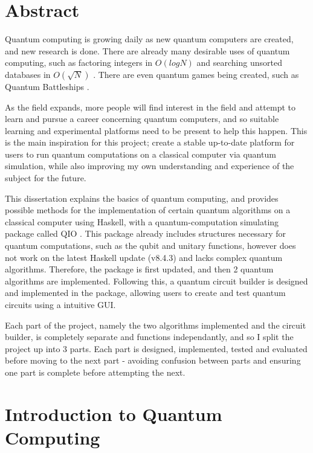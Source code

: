 \documentclass[a4paper,10pt, titlepage, twoside]{article}
\begin{document}
\section*{Abstract}
Quantum computing is growing daily as new quantum computers are created, and new research is done. There are already many desirable uses of quantum computing, such as factoring integers in $O(log N)$ \cite{shor} and searching unsorted databases in $O(\sqrt{N})$ \cite{grover}. There are even quantum games being created, such as Quantum Battleships \cite{qships}. \par
As the field expands, more people will find interest in the field and attempt to learn and pursue a career concerning quantum computers, and so suitable learning and experimental platforms need to be present to help this happen. This is the main inspiration for this project; create a stable up-to-date platform for users to run quantum computations on a classical computer via quantum simulation, while also improving my own understanding and experience of the subject for the future.\par
This dissertation explains the basics of quantum computing, and provides possible methods for the implementation of certain quantum algorithms on a classical computer using Haskell, with a quantum-computation simulating package called QIO \cite{qio}. This package already includes structures necessary for quantum computations, such as the qubit and unitary functions, however does not work on the latest Haskell update (v8.4.3) and lacks complex quantum algorithms. Therefore, the package is first updated, and then 2 quantum algorithms are implemented. Following this, a quantum circuit builder is designed and implemented in the package, allowing users to create and test quantum circuits using a intuitive GUI.\par
Each part of the project, namely the two algorithms implemented and the circuit builder, is completely separate and functions independantly, and so I split the project up into 3 parts. Each part is designed, implemented, tested and evaluated before moving to the next part - avoiding confusion between parts and ensuring one part is complete before attempting the next.
\newpage

\fancyhead[RE, LO]{\leftmark}
\tableofcontents
\clearpage
\fancyfoot[CE,CO]{\thepage}

\setcounter{page}{1}
\section{Introduction to Quantum Computing}
\end{document}
